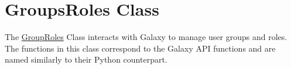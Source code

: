 \hypertarget{group__group__roles__class}{}\section{Groups\+Roles Class}
\label{group__group__roles__class}
The \hyperlink{classGroupRoles}{Group\+Roles} Class interacts with Galaxy to manage user groups and roles. The functions in this class correspond to the Galaxy A\+PI functions and are named similarly to their Python counterpart. 